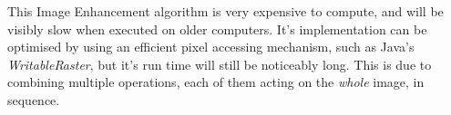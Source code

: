 \documentclass[journal,transmag]{IEEEtran}
\begin{document}
This Image Enhancement algorithm is very expensive to compute, and will be visibly slow when executed on older computers. It's implementation can be optimised by using an efficient pixel accessing mechanism, such as Java's \textit{WritableRaster}, but it's run time will still be noticeably long. This is due to combining multiple operations, each of them acting on the \textit{whole} image, in sequence.

\begin{figure}[t]
	\centering
	 \\
\end{figure}
\end{document}
